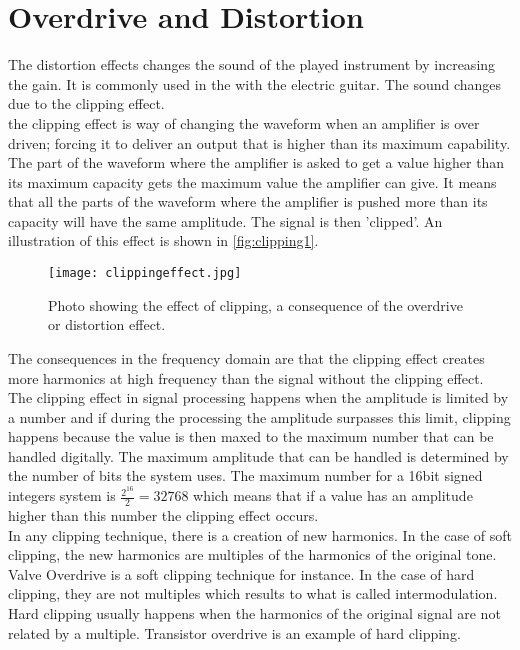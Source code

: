 \section{Overdrive and Distortion} 

The distortion effects changes the sound of the played instrument by increasing the gain. It is commonly used in the with the electric guitar. The sound changes due to the clipping effect. \\
the clipping effect is way of changing the waveform when an amplifier is over driven; forcing it to deliver an output that is higher than its maximum capability. \\
The part of the waveform where the amplifier is asked to get a value higher than its maximum capacity gets the maximum value the amplifier can give. It means that all the parts of the waveform where the amplifier is pushed more than its capacity will have the same amplitude. The signal is then 'clipped'. An illustration of this effect is shown in \autoref{fig:clipping1}.\\

\begin{figure} [htbp]
  \texttt{[image: clippingeffect.jpg]}
  \caption{Photo showing the effect of clipping, a consequence of the overdrive or distortion effect.}
  \label{fig:clipping1}
\end{figure}


The consequences in the frequency domain are that the clipping effect creates more harmonics at high frequency than the signal without the clipping effect. \\

The clipping effect in signal processing happens when the amplitude is limited by a number and if during the processing the amplitude surpasses this limit, clipping happens because the value is then maxed to the maximum number that can be handled digitally. The maximum amplitude that can be handled is determined by the number of bits the system uses. The maximum number for a 16bit signed integers system is $\frac{2^{16}}{2} = 32768$ which means that if a value has an amplitude higher than this number the clipping effect occurs. \\

In any clipping technique, there is a creation of new harmonics. In the case of soft clipping, the new harmonics are multiples of the harmonics of the original tone. Valve Overdrive is a soft clipping technique for instance. In the case of hard clipping, they are not multiples which results to what is called intermodulation. Hard clipping usually happens when the harmonics of the original signal are not related by a multiple. Transistor overdrive is an example of hard clipping.\\

